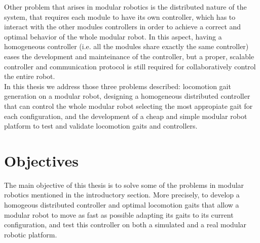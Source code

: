 Other problem that arises in modular robotics is the distributed nature of the system, that requires each module to have its own controller, which has to interact with the other modules controllers in order to achieve a correct and optimal behavior of the whole modular robot. In this aspect, having a homogeneous controller (i.e. all the modules share exactly the same controller) eases the development and mainteinance of the controller, but a proper, scalable controller and communication protocol is still required for collaboratively control the entire robot.\\

In this thesis we address those three problems described: locomotion gait generation on a modular robot, designing a homogeneous distributed controller that can control the whole modular robot selecting the most appropiate gait for each configuration, and the development of a cheap and simple modular robot platform to test and validate locomotion gaits and controllers.\\ 

\section{Objectives}
\label{introduction_objectives}

The main objective of this thesis is to solve some of the problems in modular robotics mentioned in the introductory section. More precisely, to develop a homogeous distributed controller and optimal locomotion gaits that allow a modular robot to move as fast as possible adapting its gaits to its current configuration, and test this controller on both a simulated and a real modular robotic platform.\\

